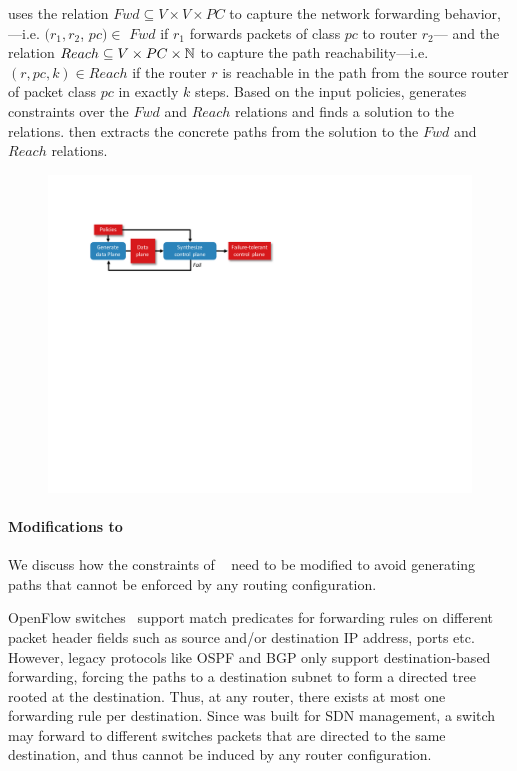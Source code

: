 \genesis uses the relation $Fwd \subseteq V \times V \times PC $  
to capture 
the network forwarding behavior,---i.e. 
$(r_1, r_2$, $pc)\in$ $Fwd$ if 
$r_1$ forwards packets of class $pc$ to router $r_2$---
and 
the relation $Reach \subseteq V \times PC \times \mathbb{N}$ 
to capture
the path reachability---i.e. $(r, pc, k)\in Reach$ if 
the router $r$ is reachable in the path from the source
router of packet class $pc$ in exactly $k$ steps. Based on
the input policies, \genesis generates constraints over the $Fwd$
and $Reach$ relations and finds a solution to the relations. 
\genesis then extracts the concrete paths from the solution to the $Fwd$ and $Reach$
relations.
\begin{figure}
	\centering
	\includegraphics[width=\columnwidth]{figures/architecture.pdf}
	\label{fig:architecture}
\end{figure}
\paragraph{Modifications to \genesis}
We  discuss how the
constraints of \genesis~\cite{genesis}
need to be modified to avoid generating paths that 
cannot be enforced by any routing configuration.

OpenFlow switches~\cite{openflow} support match predicates for
forwarding rules on different packet header fields such as source
and/or destination IP address, ports etc. However, legacy protocols
like OSPF and BGP only support destination-based forwarding, 
forcing the paths to a destination subnet to 
form a directed tree rooted at the destination. 
Thus,
at any router, there exists at most one forwarding rule per destination. 
Since \genesis was built for
SDN management,  a switch may forward to different switches
packets that are directed to the same destination,
and thus cannot be induced by any router
configuration. 

